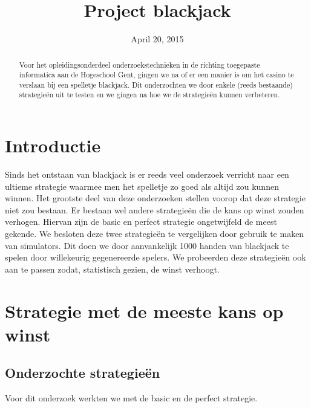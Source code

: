 \documentclass[conference]{IEEEtran}
\begin{document}
\title{Project blackjack}

\author{
}
\date{April 20, 2015}


\maketitle

\begin{abstract}
Voor het opleidingsonderdeel onderzoekstechnieken in de richting toegepaste informatica aan de Hogeschool Gent, gingen we na of er een manier is om het casino te verslaan bij een spelletje blackjack. Dit onderzochten we door enkele (reeds bestaande) strategie\"{e}n uit te testen en we gingen na hoe we de strategie\"{e}n kunnen verbeteren.
\end{abstract}

\IEEEpeerreviewmaketitle

\section{Introductie}
Sinds het ontstaan van blackjack is er reeds veel onderzoek verricht naar een ultieme strategie waarmee men het spelletje zo goed als altijd zou kunnen winnen. Het grootste deel van deze onderzoeken stellen voorop dat deze strategie niet zou bestaan. Er bestaan wel andere strategie\"{e}n die de kans op winst zouden verhogen. Hiervan zijn de basic en perfect strategie ongetwijfeld de meest gekende. We besloten deze twee strategie\"{e}n te vergelijken door gebruik te maken van simulators. Dit doen we door aanvankelijk 1000 handen van blackjack te spelen door willekeurig gegenereerde spelers. We probeerden deze strategie\"{e}n ook aan te passen zodat, statistisch gezien, de winst verhoogt. 

\section{Strategie met de meeste kans op winst}
\subsection{Onderzochte strategie\"{e}n}
Voor dit onderzoek werkten we met de basic en de perfect strategie.
\end{document}

